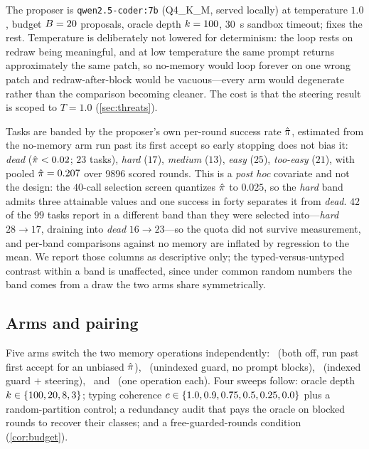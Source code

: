 The proposer is \texttt{qwen2.5-coder:7b} (Q4\_K\_M, served locally) at
temperature $1.0$, budget $B = 20$ proposals, oracle depth
$k = 100$, \SI{30}{\second} sandbox timeout;
 fixes the rest. Temperature is
deliberately not lowered for determinism: the loop rests on redraw being
meaningful, and at low temperature the same prompt returns approximately the
same patch, so no-memory would loop forever on one wrong patch and
redraw-after-block would be vacuous---every arm would degenerate rather than
the comparison becoming cleaner. The cost is that the steering result is scoped
to $T = 1.0$ (\cref{sec:threats}).

\ifsuppmatter\else\fi

Tasks are banded by the proposer's own per-round success rate $\hat{\pi}$,
estimated from the no-memory arm run past its first accept so early stopping
does not bias it: \emph{dead} ($\hat{\pi} < 0.02$; $23$ tasks), \emph{hard}
($17$), \emph{medium} ($13$), \emph{easy} ($25$), \emph{too-easy} ($21$), with
pooled $\hat{\pi} = 0.207$ over \num{9896} scored rounds. This is a \emph{post
hoc} covariate and not the design: the $40$-call selection screen quantizes
$\hat{\pi}$ to $0.025$, so the \emph{hard} band admits three attainable values and
one success in forty separates it from \emph{dead}. $42$ of the $99$ tasks
report in a different band than they were selected into---\emph{hard}
$28 \to 17$, draining into \emph{dead} $16 \to 23$---so the quota did not
survive measurement, and per-band comparisons against no memory are inflated by
regression to the mean. We report those columns as descriptive only; the
typed-versus-untyped contrast within a band is unaffected, since under common
random numbers the band comes from a draw the two arms share symmetrically.

\subsection{Arms and pairing}
Five arms switch the two memory operations independently: \armnomem\ (both off,
run past first accept for an unbiased $\hat{\pi}$), \armuntyped\ (unindexed guard,
no prompt blocks), \armtyped\ (indexed guard $+$ steering), \armguard\ and
\armsteer\ (one operation each). Four sweeps follow: oracle depth
$k \in \{100, 20, 8, 3\}$; typing coherence $c \in \{1.0, 0.9,
0.75, 0.5, 0.25, 0.0\}$ plus a random-partition control; a redundancy audit
that pays the oracle on blocked rounds to recover their classes; and a
free-guarded-rounds condition (\cref{cor:budget}).

